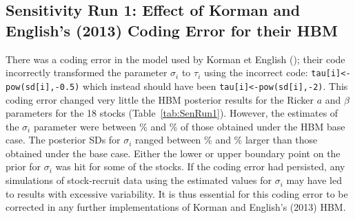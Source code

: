 \documentclass[french,11pt]{book}
\begin{document}
\endgroup{} \endgroup{}

\newpage

\subsection{Sensitivity Run 1: Effect of Korman and English's (2013) Coding Error for their HBM}\label{app:HBMFits-2-1}

There was a coding error in the model used by Korman et English (); their code incorrectly transformed the parameter \(\sigma_i\) to \(\tau_i\) using the incorrect code: \texttt{tau[i]<-pow(sd[i],-0.5)} which instead should have been \texttt{tau[i]<-pow(sd[i],-2)}. This coding error changed very little the HBM posterior results for the Ricker \(a\) and \(\beta\) parameters for the 18 stocks (Table~\ref{tab:SenRun1}). However, the estimates of the \(\sigma_i\) parameter were between \% and \% of those obtained under the HBM base case. The posterior SDs for \(\sigma_i\) ranged between \% and \% larger than those obtained under the base case. Either the lower or upper boundary point on the prior for \(\sigma_i\) was hit for some of the stocks. If the coding error had persisted, any simulations of stock-recruit data using the estimated values for \(\sigma_i\) may have led to results with excessive variability. It is thus essential for this coding error to be corrected in any further implementations of Korman and English's (2013) HBM.
\end{document}
